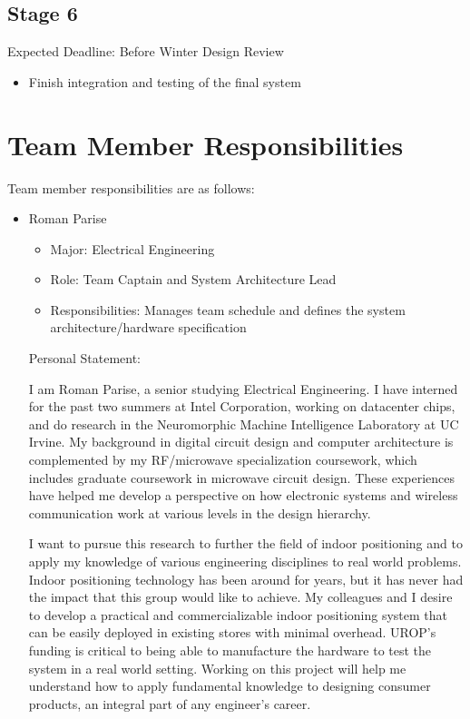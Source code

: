 \documentclass{article}
\begin{document}
\subsection{Stage 6}
Expected Deadline: Before Winter Design Review \\
\begin{itemize}
\item Finish integration and testing of the final system
\end{itemize}

\section{Team Member Responsibilities}
Team member responsibilities are as follows: \\
\begin{itemize}
\item Roman Parise
	\begin{itemize}
	\item Major: Electrical Engineering
	\item Role: Team Captain and System Architecture Lead
	\item Responsibilities: Manages team schedule and defines the system architecture/hardware specification
	\end{itemize}
Personal Statement:

I am Roman Parise, a senior studying Electrical Engineering. I have interned for the past two summers at Intel Corporation, working on datacenter chips, and do research in the Neuromorphic Machine Intelligence Laboratory at UC Irvine. My background in digital circuit design and computer architecture is complemented by my RF/microwave specialization coursework, which includes graduate coursework in microwave circuit design. These experiences have helped me develop a perspective on how electronic systems and wireless communication work at various levels in the design hierarchy.

I want to pursue this research to further the field of indoor positioning and to apply my knowledge of various engineering disciplines to real world problems. Indoor positioning technology has been around for years, but it has never had the impact that this group would like to achieve. My colleagues and I desire to develop a practical and commercializable indoor positioning system that can be easily deployed in existing stores with minimal overhead. UROP's funding is critical to being able to manufacture the hardware to test the system in a real world setting. Working on this project will help me understand how to apply fundamental knowledge to designing consumer products, an integral part of any engineer's career.


\end{itemize}
\end{document}

